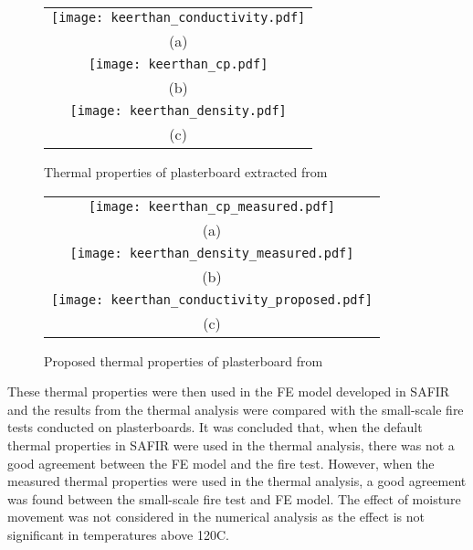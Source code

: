 \begin{figure}[htbp]
	\centering
		\begin{tabular}{c}
			\texttt{[image: keerthan\_conductivity.pdf]} \\
			(a) \\
			\texttt{[image: keerthan\_cp.pdf]} \\
			(b) \\ 
			\texttt{[image: keerthan\_density.pdf]} \\
			(c) \\
		\end{tabular} 
		\caption{Thermal properties of plasterboard extracted from }
		\label{fig:keerthan_pbprop}
\end{figure}

\begin{figure}[htbp]
	\centering
		\begin{tabular}{c}
			\texttt{[image: keerthan\_cp\_measured.pdf]} \\
			(a) \\
			\texttt{[image: keerthan\_density\_measured.pdf]} \\
			(b) \\ 
			\texttt{[image: keerthan\_conductivity\_proposed.pdf]} \\
			(c) \\
		\end{tabular} 
		\caption{Proposed thermal properties of plasterboard from }
			\label{fig:keerthan_measured}

	\end{figure}

These thermal properties were then used in the FE model developed in SAFIR and the results from the thermal analysis were compared with the small-scale fire tests conducted on plasterboards. It was concluded that, when the default thermal properties in SAFIR were used in the thermal analysis, there was not a good agreement between the FE model and the fire test. However, when the measured thermal properties were used in the thermal analysis, a good agreement was found between the small-scale fire test and FE model. The effect of moisture movement was not considered in the numerical analysis as the effect is not significant in temperatures above 120\degree C.

